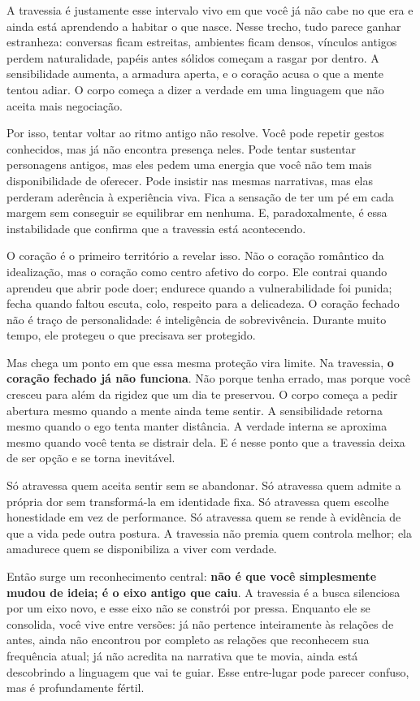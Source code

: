 \documentclass[12pt]{book}
\begin{document}
A travessia é justamente esse intervalo vivo em que você já não cabe no que era e ainda está aprendendo a habitar o que nasce. Nesse trecho, tudo parece ganhar estranheza: conversas ficam estreitas, ambientes ficam densos, vínculos antigos perdem naturalidade, papéis antes sólidos começam a rasgar por dentro. A sensibilidade aumenta, a armadura aperta, e o coração acusa o que a mente tentou adiar. O corpo começa a dizer a verdade em uma linguagem que não aceita mais negociação.

Por isso, tentar voltar ao ritmo antigo não resolve. Você pode repetir gestos conhecidos, mas já não encontra presença neles. Pode tentar sustentar personagens antigos, mas eles pedem uma energia que você não tem mais disponibilidade de oferecer. Pode insistir nas mesmas narrativas, mas elas perderam aderência à experiência viva. Fica a sensação de ter um pé em cada margem sem conseguir se equilibrar em nenhuma. E, paradoxalmente, é essa instabilidade que confirma que a travessia está acontecendo.

O coração é o primeiro território a revelar isso. Não o coração romântico da idealização, mas o coração como centro afetivo do corpo. Ele contrai quando aprendeu que abrir pode doer; endurece quando a vulnerabilidade foi punida; fecha quando faltou escuta, colo, respeito para a delicadeza. O coração fechado não é traço de personalidade: é inteligência de sobrevivência. Durante muito tempo, ele protegeu o que precisava ser protegido.

Mas chega um ponto em que essa mesma proteção vira limite. Na travessia, \textbf{o coração fechado já não funciona}. Não porque tenha errado, mas porque você cresceu para além da rigidez que um dia te preservou. O corpo começa a pedir abertura mesmo quando a mente ainda teme sentir. A sensibilidade retorna mesmo quando o ego tenta manter distância. A verdade interna se aproxima mesmo quando você tenta se distrair dela. E é nesse ponto que a travessia deixa de ser opção e se torna inevitável.

Só atravessa quem aceita sentir sem se abandonar. Só atravessa quem admite a própria dor sem transformá-la em identidade fixa. Só atravessa quem escolhe honestidade em vez de performance. Só atravessa quem se rende à evidência de que a vida pede outra postura. A travessia não premia quem controla melhor; ela amadurece quem se disponibiliza a viver com verdade.

Então surge um reconhecimento central: \textbf{não é que você simplesmente mudou de ideia; é o eixo antigo que caiu}. A travessia é a busca silenciosa por um eixo novo, e esse eixo não se constrói por pressa. Enquanto ele se consolida, você vive entre versões: já não pertence inteiramente às relações de antes, ainda não encontrou por completo as relações que reconhecem sua frequência atual; já não acredita na narrativa que te movia, ainda está descobrindo a linguagem que vai te guiar. Esse entre-lugar pode parecer confuso, mas é profundamente fértil.
\end{document}
